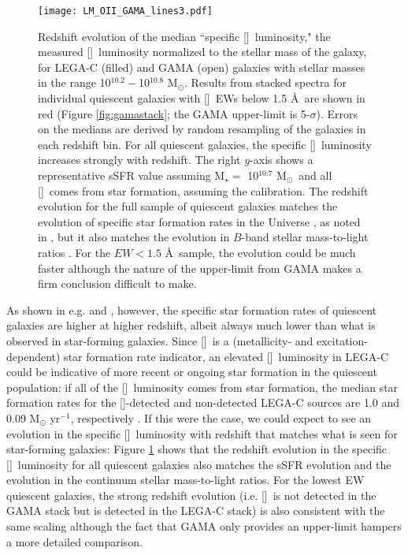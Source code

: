 \documentclass[twocolumn,natbib,iop,hyperref]{aastex62}
\newcommand{\msol}{M$_{\odot}$}
\newcommand{\oii}{[\ion{O}{2}]}
\begin{document}
\begin{figure}%
\begin{center}
\texttt{[image: LM\_OII\_GAMA\_lines3.pdf]}
\caption{Redshift evolution of the median ``specific \oii\ luminosity," the measured \oii\ luminosity normalized to the stellar mass of the galaxy, for LEGA-C (filled) and GAMA (open) galaxies with stellar masses in the range 10$^{10.2}-$10$^{10.8}$ \msol.  Results from stacked spectra for individual quiescent galaxies with \oii\ EWs below 1.5 \AA\ are shown in red (Figure \ref{fig:gamastack}; the GAMA upper-limit is 5-$\sigma$).  Errors on the medians are derived by random resampling of the galaxies in each redshift bin.  For all quiescent galaxies, the specific \oii\ luminosity increases strongly with redshift.  The right $y$-axis shows a representative sSFR value assuming M$_{\star} =$ 10$^{10.7}$ \msol\ and all \oii\ comes from star formation, assuming the \citet{2004AJ....127.2002K} calibration.  The redshift evolution for the full sample of quiescent galaxies matches the evolution of specific star formation rates in the Universe \cite[][dashed line]{2014ApJS..214...15S}, as noted in \citep{2014ApJ...796...35F}, but it also matches the evolution in $B$-band stellar mass-to-light ratios \cite[][dotted line]{2005ApJ...631..145V}.  For the $EW < 1.5$ \AA\ sample, the evolution could be much faster although the nature of the upper-limit from GAMA makes a firm conclusion difficult to make.}
\label{fig:loii}
\end{center}
\end{figure}





As shown in e.g. \citet{2014ApJ...796...35F} and \citet{2019ApJ...877..140L}, however, the specific star formation rates of quiescent galaxies are higher at higher redshift, albeit always much lower than what is observed in star-forming galaxies.  Since \oii\ is a (metallicity- and excitation-dependent) star formation rate indicator, an elevated \oii\ luminosity in LEGA-C could be indicative of more recent or ongoing star formation in the quiescent population: if all of the \oii\ luminosity comes from star formation, the median star formation rates for the \oii-detected and non-detected LEGA-C sources are 1.0 and 0.09 M$_{\odot}$ yr$^{-1}$, respectively \citep{2004AJ....127.2002K}.  If this were the case, we could expect to see an evolution in the specific \oii\ luminosity with redshift that matches what is seen for star-forming galaxies: Figure \ref{fig:loii} shows that the redshift evolution in the specific \oii\ luminosity for all quiescent galaxies also matches the sSFR evolution and the evolution in the continuum stellar mass-to-light ratios.  For the lowest EW quiescent galaxies, the strong redshift evolution (i.e. \oii\ is not detected in the GAMA stack but is detected in the LEGA-C stack) is also consistent with the same scaling although the fact that GAMA only provides an upper-limit hampers a more detailed comparison.
\end{document}
